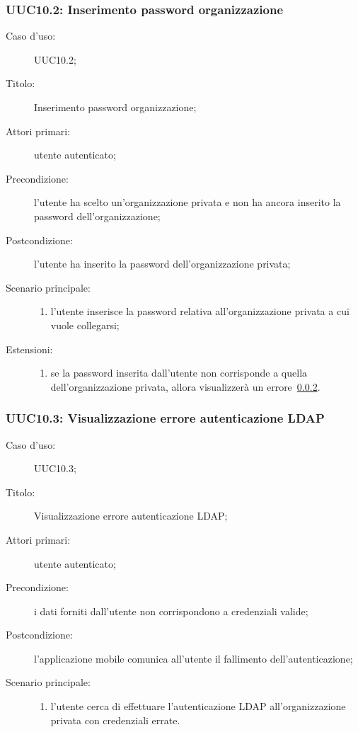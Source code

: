 \documentclass[../../../analisi-dei-requisiti.tex]{subfiles}
\begin{document}
\subsubsection{UUC10.2: Inserimento password organizzazione}%
\label{subs:UUC10.2}
\begin{description}
  \item[Caso d'uso:] UUC10.2;
  \item[Titolo:] Inserimento password organizzazione;
  \item[Attori primari:] utente autenticato;
  \item[Precondizione:] l'utente ha scelto un'organizzazione privata e non ha ancora inserito la password dell'organizzazione;
  \item[Postcondizione:] l'utente ha inserito la password dell'organizzazione privata;
  \item[Scenario principale:]
        \begin{enumerate}
          \item l'utente inserisce la password relativa all'organizzazione privata a cui vuole collegarsi;
        \end{enumerate}
  \item[Estensioni:]
        \begin{enumerate}
          \item se la password inserita dall'utente non corrisponde a quella dell'organizzazione privata, allora visualizzerà un errore~\ref{subs:UUC10.3}.
        \end{enumerate}
\end{description}

\subsubsection{UUC10.3: Visualizzazione errore autenticazione LDAP}%
\label{subs:UUC10.3}
\begin{description}
  \item[Caso d'uso:] UUC10.3;
  \item[Titolo:] Visualizzazione errore autenticazione LDAP\@;
  \item[Attori primari:] utente autenticato;
  \item[Precondizione:] i dati forniti dall'utente non corrispondono a credenziali valide;
  \item[Postcondizione:] l'applicazione mobile comunica all'utente il fallimento dell'autenticazione;
  \item[Scenario principale:]
        \begin{enumerate}
          \item l'utente cerca di effettuare l'autenticazione LDAP all'organizzazione privata con credenziali errate.
        \end{enumerate}
\end{description}
\end{document}
